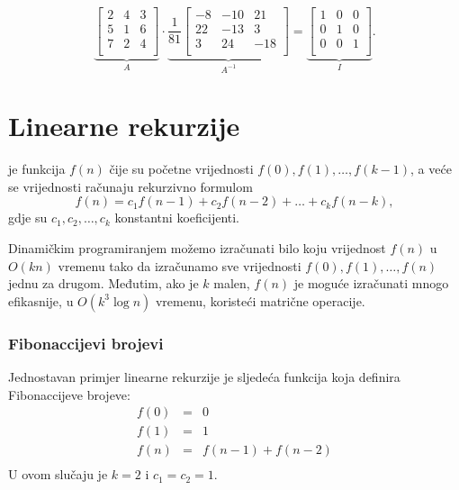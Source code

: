\[
\underbrace{
 \begin{bmatrix}
  2 & 4 & 3\\
  5 & 1 & 6\\
  7 & 2 & 4\\
 \end{bmatrix}
}_{A}
\cdot
\underbrace{
 \frac{1}{81}
 \begin{bmatrix}
   -8 & -10 & 21 \\
   22 & -13 & 3 \\
   3 & 24 & -18 \\
 \end{bmatrix}
}_{A^{-1}}
=
\underbrace{
 \begin{bmatrix}
  1 & 0 & 0 \\
  0 & 1 & 0 \\
  0 & 0 & 1 \\
 \end{bmatrix}
}_{I}.
\]

\section{Linearne rekurzije}


je funkcija $f(n)$
čije su početne vrijednosti
$f(0),f(1),\ldots,f(k-1)$,
a veće se vrijednosti
računaju rekurzivno formulom
\[f(n) = c_1 f(n-1) + c_2 f(n-2) + \ldots + c_k f (n-k),\]
gdje su $c_1,c_2,\ldots,c_k$ konstantni koeficijenti.

Dinamičkim programiranjem možemo izračunati
bilo koju vrijednost $f(n)$ u $O(kn)$ vremenu tako da izračunamo
sve vrijednosti $f(0),f(1),\ldots,f(n)$ jednu za drugom.
Međutim, ako je $k$ malen, $f(n)$ je moguće izračunati
mnogo efikasnije, u $O(k^3 \log n)$
vremenu, koristeći matrične operacije.

\subsubsection{Fibonaccijevi brojevi}


Jednostavan primjer linearne rekurzije je
sljedeća funkcija koja definira Fibonaccijeve brojeve:
\[
\begin{array}{lcl}
f(0) & = & 0 \\
f(1) & = & 1 \\
f(n) & = & f(n-1)+f(n-2) \\
\end{array}
\]
U ovom slučaju je $k=2$ i $c_1=c_2=1$.

